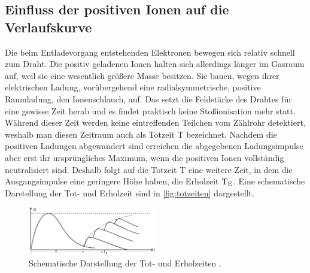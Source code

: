 \subsection{Einfluss der positiven Ionen auf die Verlaufskurve}
\label{subsec:posIon}

Die beim Entladevorgang entstehenden Elektronen bewegen sich relativ schnell zum Draht. Die positiv geladenen Ionen halten sich allerdings länger im Gasraum auf, weil sie eine wesentlich größere Masse besitzen. Sie bauen, wegen ihrer elektrischen Ladung, vorübergehend
eine radialsymmetrische, positive Raumladung, den Ionenschlauch, auf. Das setzt die Feldstärke des Drahtes für eine gewisse Zeit herab und es findet praktisch keine Stoßionisation mehr statt. Während dieser Zeit werden keine eintreffenden Teilchen vom Zählrohr detektiert,
weshalb man diesen Zeitraum auch als Totzeit T bezeichnet. Nachdem die positiven Ladungen abgewandert sind erreichen die abgegebenen Ladungsimpulse aber erst ihr ursprüngliches Maximum, wenn die positiven Ionen vollständig neutralisiert sind.
Deshalb folgt auf die Totzeit T eine weitere Zeit, in dem die Ausgangsimpulse eine geringere Höhe haben, die Erholzeit $\text{T}_{\text E}$. Eine schematische Darstellung der Tot- und Erholzeit sind in \autoref{fig:totzeiten} dargestellt.
\begin{figure}[H]
    \centering
    \includegraphics[width=0.5\textwidth]{data/totzeiten.png}
    \caption{Schematische Darstellung der Tot- und Erholzeiten \cite{Anleitung703}.}
    \label{fig:totzeiten}
\end{figure}


